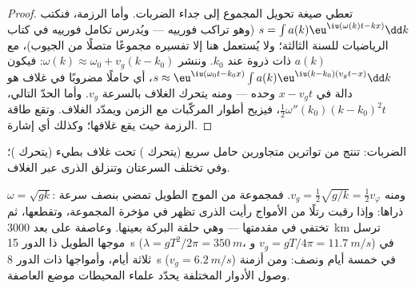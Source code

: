 \begin{proof}
تعطي صيغة تحويل المجموع إلى جداء الضربات. وأما الرزمة، فنكتب $s =
\int a(k)\eu^{\iu(\omega(k)t - kx)}\dd k$ (وهو تراكب فورييه --- ويُدرس
تكامل فورييه في كتاب الرياضيات للسنة الثالثة؛ ولا يُستعمل هنا إلا
تفسيره مجموعًا متصلًا من الجيوب)، مع
$a(k)$ ذات ذروة عند $k_0$. وننشر $\omega(k) \approx \omega_0 + v_g(k - k_0)$: فيكون
$s \approx \eu^{\iu(\omega_0t - k_0x)}\int a(k)\eu^{\iu(k - k_0)(v_gt - x)}\dd k$، أي
حاملًا مضروبًا في غلاف هو دالة في $x - v_gt$ وحده --- ومنه
يتحرك الغلاف بالسرعة $v_g$. وأما الحدّ التالي، $\tfrac12\omega''(k_0)(k - k_0)^2t$،
فيزيح أطوار المركّبات مع الزمن ويمدّد الغلاف. وتقع طاقة
الرزمة حيث يقع غلافها؛ وكذلك أي إشارة.
\end{proof}

\begin{omfigure}

{\small الضربات: تنتج من تواترين متجاورين حامل سريع
(يتحرك ) تحت غلاف بطيء (يتحرك )؛ وفي  تختلف السرعتان وتنزلق
الذرى عبر الغلاف.}
\end{omfigure}

\begin{example}\label{ex:b2:dispersion-wave-packets:deepwater}
$\omega = \sqrt{gk}$: ومنه $v_g = \tfrac12\sqrt{g/k} = \tfrac12v_\varphi$. فمجموعة من
الموج الطويل تمضي بنصف سرعة ذراها: وإذا رقبت رتلًا من الأمواج
رأيت الذرى تظهر في مؤخرة المجموعة، وتقطعها، ثم
تختفي في مقدمتها --- وهي حلقة البركة بعينها. وعاصفة على بعد \qty{3000}{km}
ترسل موجها الطويل ذا الدور \qty{15}{s} ($\lambda = gT^2/2\pi = \qty{350}{m}$، و $v_g =
gT/4\pi = \qty{11.7}{m/s}$) في ثلاثة أيام، وأمواجها ذات الدور \qty{8}{s} ($v_g =
\qty{6.2}{m/s}$) في خمسة أيام ونصف: ومن أزمنة وصول
الأدوار المختلفة يحدّد علماء المحيطات موضع العاصفة.
\end{example}

